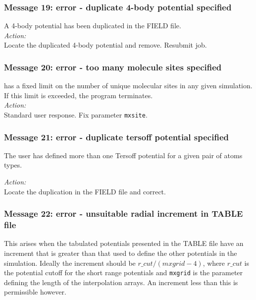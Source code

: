 \subsubsection*{Message 19: error - duplicate 4-body potential specified}

A 4-body potential has been duplicated in the FIELD file.\\

\noindent
{\em Action:}\\
Locate the duplicated 4-body potential  and remove. Resubmit job.

\subsubsection*{Message 20: error - too many molecule sites specified}

\D{} has a fixed limit on the number of unique molecular sites in
any given simulation. If this limit is exceeded, the program
terminates. \\ 

\noindent
{\em Action:} \\ 
Standard user response. Fix parameter {\tt mxsite}.

\subsubsection*{Message 21: error - duplicate tersoff potential specified}

The user has defined more than one Tersoff potential for a given pair
of atoms types.

\noindent
{\em Action:} \\ 
Locate the duplication in the FIELD file and correct.

\subsubsection*{Message 22: error - unsuitable radial increment in
TABLE file}

This arises when the tabulated potentials  presented in the TABLE file
have an increment that is greater than that used to define the other
potentials in the simulation. Ideally the increment should be
$r\_{cut}/(mxgrid-4)$, where $r\_{cut}$ is the potential cutoff for the
short range potentials and {\tt mxgrid} is the parameter defining the
length of the interpolation arrays. An increment less than this is
permissible however.\\

